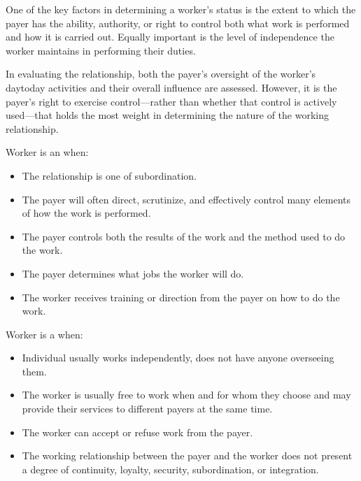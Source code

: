 \documentclass[letterpaper,10pt,english]{sphinxmanual}
\begin{document}
\sphinxAtStartPar
{}

\sphinxAtStartPar
One of the key factors in determining a worker’s status is the extent to which the payer has the ability, authority, or
right to control both what work is performed and how it is carried out. Equally important is the level of independence the
worker maintains in performing their duties.

\sphinxAtStartPar
In evaluating the relationship, both the payer’s oversight of the worker’s day\sphinxhyphen{}to\sphinxhyphen{}day activities and their overall
influence are assessed. However, it is the payer’s right to exercise control—rather than whether that control is actively
used—that holds the most weight in determining the nature of the working relationship.

\sphinxAtStartPar
Worker is an  when:
\begin{itemize}
\item {} 
\sphinxAtStartPar
The relationship is one of subordination.

\item {} 
\sphinxAtStartPar
The payer will often direct, scrutinize, and effectively control many elements of how the work is performed.

\item {} 
\sphinxAtStartPar
The payer controls both the results of the work and the method used to do the work.

\item {} 
\sphinxAtStartPar
The payer determines what jobs the worker will do.

\item {} 
\sphinxAtStartPar
The worker receives training or direction from the payer on how to do the work.

\end{itemize}

\sphinxAtStartPar
Worker is a  when:
\begin{itemize}
\item {} 
\sphinxAtStartPar
Individual usually works independently, does not have anyone overseeing them.

\item {} 
\sphinxAtStartPar
The worker is usually free to work when and for whom they choose and may provide their services to different payers at the same time.

\item {} 
\sphinxAtStartPar
The worker can accept or refuse work from the payer.

\item {} 
\sphinxAtStartPar
The working relationship between the payer and the worker does not present a degree of continuity, loyalty, security, subordination, or integration.

\end{itemize}
\end{document}

